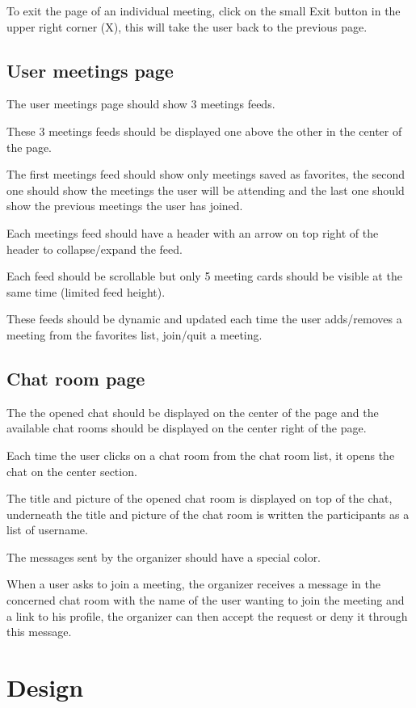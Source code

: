 \documentclass[conference]{IEEEtran}
\begin{document}
To exit the page of an individual meeting, click on the small Exit button in the upper right corner (X), this will take the user back to the previous page.

\subsection{User meetings page}

The user meetings page should show 3 meetings feeds.

These 3 meetings feeds should be displayed one above the other in the center of the page.

The first meetings feed should show only meetings saved as favorites, the second one should show the meetings the user will be attending and the last one should show the previous meetings the user has joined.

Each meetings feed should have a header with an arrow on top right of the header to collapse/expand the feed.

Each feed should be scrollable but only 5 meeting cards should be visible at the same time (limited feed height).

These feeds should be dynamic and updated each time the user adds/removes a meeting from the favorites list, join/quit a meeting.

\subsection{Chat room page}

The the opened chat should be displayed on the center of the page and the available chat rooms should be displayed on the center right of the page.

Each time the user clicks on a chat room from the chat room list, it opens the chat on the center section. 

The title and picture of the opened chat room is displayed on top of the chat, underneath the title and picture of the chat room is written the participants as a list of username.

The messages sent by the organizer should have a special color. 

When a user asks to join a meeting, the organizer receives a message in the concerned chat room with the name of the user wanting to join the meeting and a link to his profile, the organizer can then accept the request or deny it through this message.

\section{Design}
\end{document}
